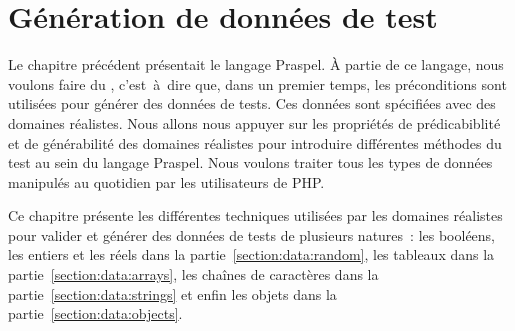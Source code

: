 \chapter{Génération de données de test}
\label{chapter:data}

\mminitoc

Le chapitre précédent présentait le langage Praspel. À partie de ce langage,
nous voulons faire du , c'est~à~dire que, dans
un premier temps, les préconditions sont utilisées pour générer des données de
tests. Ces données sont spécifiées avec des domaines réalistes. Nous allons nous
appuyer sur les propriétés de prédicabiblité et de générabilité des domaines
réalistes pour introduire différentes méthodes du test au sein du langage
Praspel. Nous voulons traiter tous les types de données manipulés au quotidien
par les utilisateurs de PHP.

Ce chapitre présente les différentes techniques utilisées par les domaines
réalistes pour valider et générer des données de tests de plusieurs natures~:
les booléens, les entiers et les réels dans la partie~\ref{section:data:random},
les tableaux dans la partie~\ref{section:data:arrays}, les chaînes de caractères
dans la partie~\ref{section:data:strings} et enfin les objets dans la
partie~\ref{section:data:objects}.

